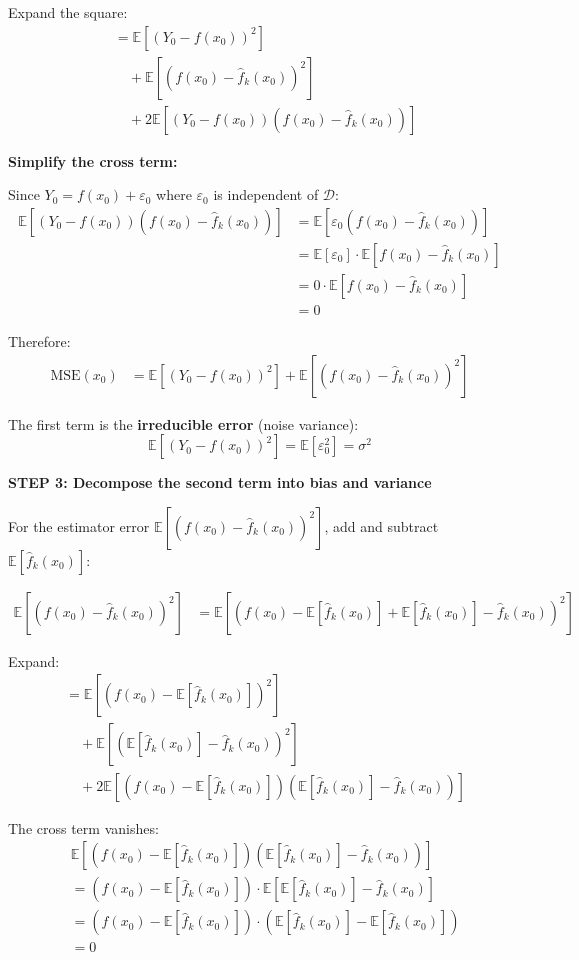 \documentclass[12pt]{article}
\begin{document}
\begin{solution}
Expand the square:
\begin{align*}
&= \mathbb{E}[(Y_0 - f(x_0))^2] \\
&\quad + \mathbb{E}[(f(x_0) - \hat{f}_k(x_0))^2] \\
&\quad + 2\mathbb{E}[(Y_0 - f(x_0))(f(x_0) - \hat{f}_k(x_0))]
\end{align*}

\textbf{Simplify the cross term:}

Since \(Y_0 = f(x_0) + \varepsilon_0\) where \(\varepsilon_0\) is independent of \(\mathcal{D}\):
\begin{align*}
\mathbb{E}[(Y_0 - f(x_0))(f(x_0) - \hat{f}_k(x_0))] &= \mathbb{E}[\varepsilon_0 (f(x_0) - \hat{f}_k(x_0))] \\
&= \mathbb{E}[\varepsilon_0] \cdot \mathbb{E}[f(x_0) - \hat{f}_k(x_0)] \\
&= 0 \cdot \mathbb{E}[f(x_0) - \hat{f}_k(x_0)] \\
&= 0
\end{align*}

Therefore:
\begin{align*}
\text{MSE}(x_0) &= \mathbb{E}[(Y_0 - f(x_0))^2] + \mathbb{E}[(f(x_0) - \hat{f}_k(x_0))^2]
\end{align*}

The first term is the \textbf{irreducible error} (noise variance):
\[
\mathbb{E}[(Y_0 - f(x_0))^2] = \mathbb{E}[\varepsilon_0^2] = \sigma^2
\]

\textbf{STEP 3: Decompose the second term into bias and variance}

For the estimator error \(\mathbb{E}[(f(x_0) - \hat{f}_k(x_0))^2]\), add and subtract \(\mathbb{E}[\hat{f}_k(x_0)]\):

\begin{align*}
\mathbb{E}[(f(x_0) - \hat{f}_k(x_0))^2] &= \mathbb{E}[(f(x_0) - \mathbb{E}[\hat{f}_k(x_0)] + \mathbb{E}[\hat{f}_k(x_0)] - \hat{f}_k(x_0))^2]
\end{align*}

Expand:
\begin{align*}
&= \mathbb{E}[(f(x_0) - \mathbb{E}[\hat{f}_k(x_0)])^2] \\
&\quad + \mathbb{E}[(\mathbb{E}[\hat{f}_k(x_0)] - \hat{f}_k(x_0))^2] \\
&\quad + 2\mathbb{E}[(f(x_0) - \mathbb{E}[\hat{f}_k(x_0)])(\mathbb{E}[\hat{f}_k(x_0)] - \hat{f}_k(x_0))]
\end{align*}

The cross term vanishes:
\begin{align*}
&\mathbb{E}[(f(x_0) - \mathbb{E}[\hat{f}_k(x_0)])(\mathbb{E}[\hat{f}_k(x_0)] - \hat{f}_k(x_0))] \\
&= (f(x_0) - \mathbb{E}[\hat{f}_k(x_0)]) \cdot \mathbb{E}[\mathbb{E}[\hat{f}_k(x_0)] - \hat{f}_k(x_0)] \\
&= (f(x_0) - \mathbb{E}[\hat{f}_k(x_0)]) \cdot (\mathbb{E}[\hat{f}_k(x_0)] - \mathbb{E}[\hat{f}_k(x_0)]) \\
&= 0
\end{align*}


\end{solution}
\end{document}
